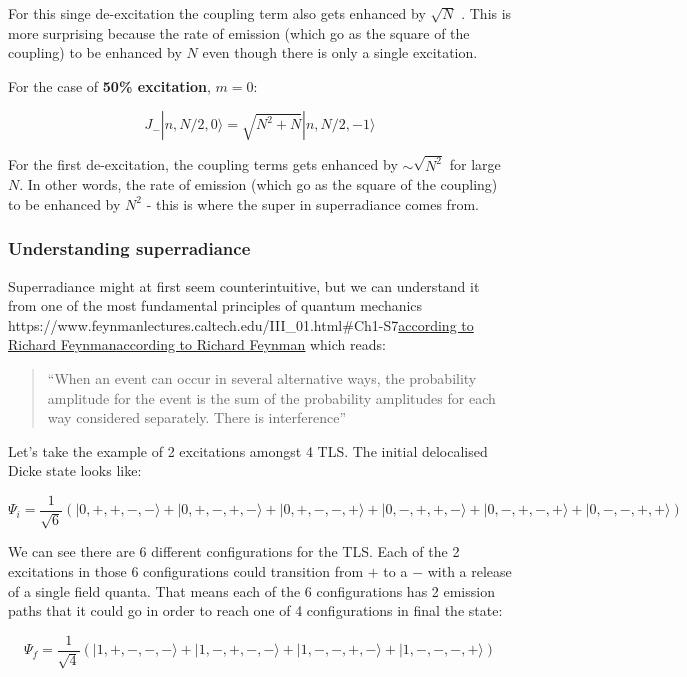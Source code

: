 \documentclass[
]{article}
\let\oldhref\href
\renewcommand{\href}[2]{\ifx#1\urlprefix\oldhref{#1}{#2}\else\uline{\oldhref{#1}{#2}}\fi}
\renewcommand{\[}{\begin{equation}}
\renewcommand{\]}{\end{equation}}
\begin{document}
For this singe de-excitation the coupling term also gets enhanced by
\(\sqrt{N}\) . This is more surprising because the rate of emission
(which go as the square of the coupling) to be enhanced by \(N\) even
though there is only a single excitation.

For the case of \textbf{50\% excitation}, \(m=0\):

\[
J_- |n, N/2, 0 \rangle  = \sqrt{N^2 + N}|n, N/2, -1\rangle
\]

For the first de-excitation, the coupling terms gets enhanced by
\(\sim\sqrt{N^2}\) for large \(N\). In other words, the rate of emission
(which go as the square of the coupling) to be enhanced by \(N^2\) -
this is where the super in superradiance comes from.

\subsubsection{Understanding
superradiance}\label{understanding-superradiance}

Superradiance might at first seem counterintuitive, but we can
understand it from one of the most fundamental principles of quantum
mechanics
\href{https://www.feynmanlectures.caltech.edu/III_01.html\#Ch1-S7}{according
to Richard Feynman} which reads:

\begin{quote}
``When an event can occur in several alternative ways, the probability
amplitude for the event is the sum of the probability amplitudes for
each way considered separately. There is interference''
\end{quote}

Let's take the example of 2 excitations amongst 4 TLS. The initial
delocalised Dicke state looks like:

\[
\Psi_i = \frac{1}{\sqrt{6}}\left(| 0, +, +, -, - \rangle + | 0, +, -, +, - \rangle + | 0, +, -, -, + \rangle + | 0, -, +, +, - \rangle + | 0, -, +, -, + \rangle + | 0, -, -, +, + \rangle \right)
\]

We can see there are 6 different configurations for the TLS. Each of the
2 excitations in those 6 configurations could transition from \(+\) to a
\(-\) with a release of a single field quanta. That means each of the 6
configurations has 2 emission paths that it could go in order to reach
one of 4 configurations in final the state:

\[
\Psi_f = \frac{1}{\sqrt{4}}\left(| 1, +, -, -, - \rangle + | 1, -, +, -, - \rangle + | 1, -, -, +, - \rangle + | 1, -, -, -, + \rangle \right)
\]
\end{document}
